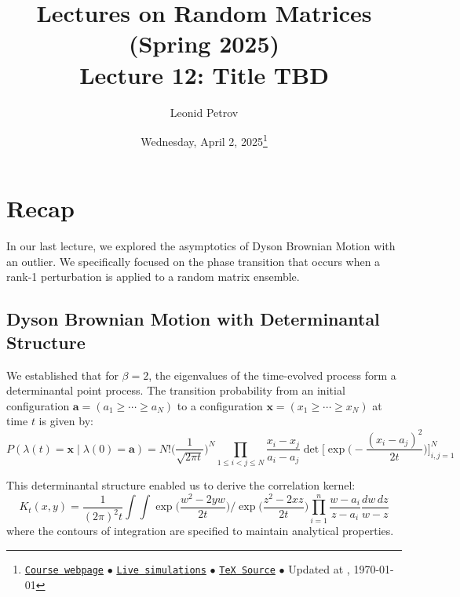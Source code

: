 \documentclass[letterpaper,11pt,oneside,reqno]{article}
\numberwithin{equation}{section}
\theoremstyle{definition}
\begin{document}
\title{Lectures on Random Matrices
(Spring 2025)
\\Lecture 12: Title TBD}


\date{Wednesday, April 2, 2025\footnote{\href{https://lpetrov.cc/rmt25/}{\texttt{Course webpage}}
$\bullet$ \href{https://lpetrov.cc/simulations/model/random-matrices/}{\texttt{Live simulations}}
$\bullet$ \href{https://lpetrov.cc/rmt25/rmt25-notes/rmt2025-l12.tex}{\texttt{TeX Source}}
$\bullet$
Updated at \currenttime, \today}}



\author{Leonid Petrov}


\maketitle
\tableofcontents


\section{Recap}

In our last lecture, we explored the asymptotics of Dyson Brownian Motion with an outlier. We specifically focused on the phase transition that occurs when a rank-1 perturbation is applied to a random matrix ensemble.

\subsection{Dyson Brownian Motion with Determinantal Structure}

We established that for $\beta=2$, the eigenvalues of the time-evolved process form a determinantal point process. The transition probability from an initial configuration $\mathbf{a} = (a_1 \geq \cdots \geq a_N)$ to a configuration $\mathbf{x} = (x_1 \geq \cdots \geq x_N)$ at time $t$ is given by:
\begin{equation}
P(\lambda(t) = \mathbf{x} \mid \lambda(0) = \mathbf{a}) = N! \Big(\frac{1}{\sqrt{2\pi t}}\Big)^N \prod_{1\leq i<j\leq N}\frac{x_i - x_j}{a_i - a_j} \det\Big[\exp\Big(-\frac{(x_i - a_j)^2}{2t}\Big)\Big]_{i,j=1}^N
\end{equation}

This determinantal structure enabled us to derive the correlation kernel:
\begin{equation}
K_t(x,y) = \frac{1}{(2\pi)^2 t} \int\int \exp\Big(\frac{w^2 - 2yw}{2t}\Big) \bigg/ \exp\Big(\frac{z^2 - 2xz}{2t}\Big) \prod_{i=1}^n \frac{w-a_i}{z-a_i} \frac{dw\,dz}{w-z}
\end{equation}
where the contours of integration are specified to maintain analytical properties.
\end{document}
